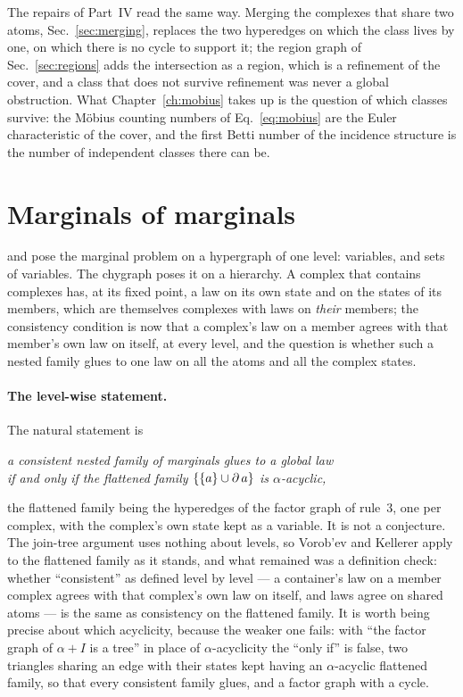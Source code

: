 The repairs of Part~IV read the same way. Merging the complexes that share
two atoms, Sec.~\ref{sec:merging}, replaces the two hyperedges on which the
class lives by one, on which there is no cycle to support it; the region
graph of Sec.~\ref{sec:regions} adds the intersection as a region, which is
a refinement of the cover, and a class that does not survive refinement was
never a global obstruction. What Chapter~\ref{ch:mobius} takes up is the
question of which classes survive: the M\"obius counting numbers of
Eq.~\eqref{eq:mobius} are the Euler characteristic of the cover, and the
first Betti number of the incidence structure is the number of independent
classes there can be.

\section{Marginals of marginals}
\label{sec:mg-nested}

\citeauthor{vorobev1962} and \citeauthor{kellerer1964} pose the marginal
problem on a hypergraph of one level: variables, and sets of variables. The
chygraph poses it on a hierarchy. A complex that contains complexes has, at
its fixed point, a law on its own state and on the states of its members,
which are themselves complexes with laws on \emph{their} members; the
consistency condition is now that a complex's law on a member agrees with
that member's own law on itself, at every level, and the question is whether
such a nested family glues to one law on all the atoms and all the complex
states.

\paragraph{The level-wise statement.} The natural statement is

\begin{center}
\emph{a consistent nested family of marginals glues to a global law\\
if and only if the flattened family $\{\{a\}\cup\operatorname{\partial} a\}$ is
$\alpha$-acyclic,}
\end{center}

the flattened family being the hyperedges of the factor graph of rule~3,
one per complex, with the complex's own state kept as a variable. It is
not a conjecture. The join-tree argument uses nothing about levels, so
Vorob'ev and Kellerer apply to the flattened family as it stands, and
what remained was a definition check: whether ``consistent'' as defined
level by level --- a container's law on a member complex agrees with that
complex's own law on itself, and laws agree on shared atoms --- is the
same as consistency on the flattened family. It is worth being precise
about which acyclicity, because the weaker one fails: with ``the factor
graph of $\alpha+I$ is a tree'' in place of $\alpha$-acyclicity the
``only if'' is false, two triangles sharing an edge with their states kept
having an $\alpha$-acyclic flattened family, so that every consistent
family glues, and a factor graph with a cycle.


